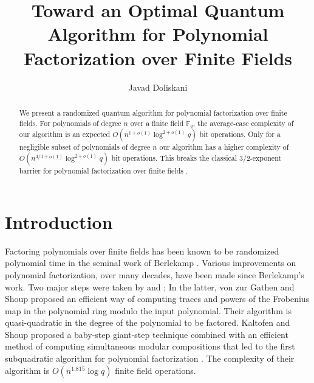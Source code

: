 \documentclass{article}
\title{Toward an Optimal Quantum Algorithm for Polynomial Factorization over Finite Fields}
\author[1]{Javad Doliskani}
\affil[1]{\small Institute for Quantum Computing, University of Waterloo}
\date{}
\theoremstyle{plain}
\theoremstyle{definition}
\def\F{\ensuremath{\mathbb{F}}}
\begin{document}
\maketitle

\begin{abstract}
	We present a randomized quantum algorithm for polynomial factorization over finite fields. For 
	polynomials of degree $n$ over a finite field $\F_q$, the average-case complexity of our 
	algorithm is an expected $O(n^{1 + o(1)} \log^{2 + o(1)}q)$ bit operations. Only for a 
	negligible subset of polynomials of degree $n$ our algorithm has a higher complexity of $O(n^{4 
	/ 3 + o(1)} \log^{2 + o(1)}q)$ bit operations. This breaks the classical $3/2$-exponent 
	barrier for polynomial factorization over finite fields \cite{guo2016alg}.
\end{abstract}




\section{Introduction}
\label{sec:intro}

Factoring polynomials over finite fields has been known to be randomized polynomial time in the 
seminal work of Berlekamp \cite{Berlekamp70}. Various improvements on polynomial factorization, 
over many decades, have been made since Berlekamp's work. Two major steps were taken by 
\cite{cantor1981new} and \cite{von1992computing}; In the latter, von zur Gathen and Shoup proposed 
an efficient way of computing traces and powers of the Frobenius map in the polynomial ring modulo 
the input polynomial. Their algorithm is quasi-quadratic in the degree of the polynomial to be 
factored. Kaltofen and Shoup proposed a baby-step giant-step technique combined with an efficient 
method of computing simultaneous modular compositions that led to the first subquadratic algorithm 
for polynomial factorization \cite{KaSh98}. The complexity of their algorithm is $O(n^{1.815}\log 
q)$ finite field operations. 
\end{document}
